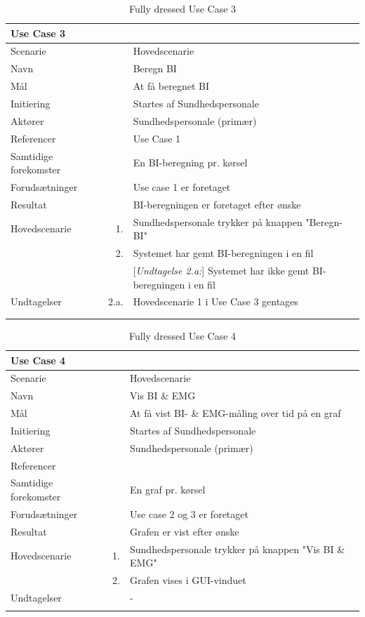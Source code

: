 \begin{longtabu} to  %
	{\large \textbf{Use Case 3}} && \\
	\toprule
	Scenarie 				&&	Hovedscenarie\\
	Navn 					&& 	Beregn BI\\
	Mål 					&& 	At få beregnet BI\\
	Initiering 				&& 	Startes af Sundhedspersonale\\
	Aktører 				&& 	Sundhedspersonale (primær)\\
	Referencer 				&& 	Use Case 1\\
	Samtidige forekomster  	&& 	En BI-beregning pr. kørsel \\
	Forudsætninger 			&&	Use case 1 er foretaget\\ 
	Resultat 				&& 	BI-beregningen er foretaget efter ønske\\ \midrule
	Hovedscenarie 			&    1. 	&	Sundhedspersonale trykker på knappen "Beregn-BI"\\	
							&    2. 	& 	Systemet har gemt BI-beregningen i en fil\\
                             &&[\textit{Undtagelse 2.a:}] Systemet har ikke gemt BI-beregningen i en fil\\ \midrule
Undtagelser 			& 2.a. & Hovedscenarie 1 i Use Case 3 gentages\\  \\ \bottomrule
	
	\caption{Fully dressed Use Case 3}
	\label{UC3}
\end{longtabu}

\begin{longtabu} to  %
	{\large \textbf{Use Case 4}} && \\
	\toprule
	Scenarie 				&&	Hovedscenarie\\
	Navn 					&& 	Vis BI \& EMG\\
	Mål 					&& 	At få vist BI- \& EMG-måling over tid på en graf\\
	Initiering 				&& 	Startes af Sundhedspersonale\\
	Aktører 				&& 	Sundhedspersonale (primær)\\
	Referencer 				&& 	\\
	Samtidige forekomster  	&& 	En graf pr. kørsel \\
	Forudsætninger 			&&	Use case 2 og 3 er foretaget\\ 
	Resultat 				&& 	Grafen er vist efter ønske\\ \midrule
	Hovedscenarie 			&    1. 	&	Sundhedspersonale trykker på knappen "Vis BI \& EMG"\\				 	
							&    2. 	& 	Grafen vises i GUI-vinduet\\
	Undtagelser 			&			& 	-  \\ \bottomrule
	
	\caption{Fully dressed Use Case 4}
	\label{UC4}
\end{longtabu}


